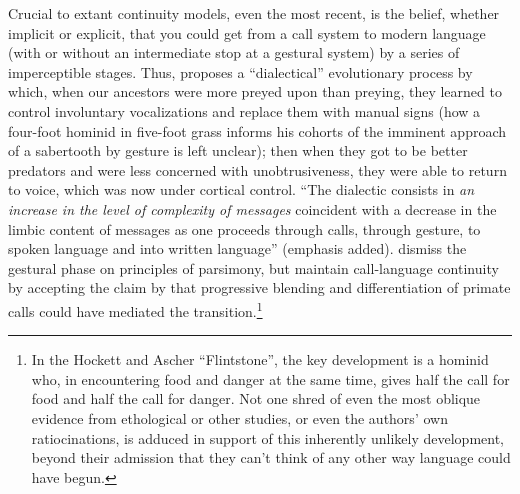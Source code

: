Crucial to extant continuity models, even the most recent, is
the belief, whether implicit or explicit, that you could get from a call system to modern language (with or without an intermediate stop at a gestural system) by a series of imperceptible stages. Thus, \citet{Stephenson1979} proposes a ``dialectical'' evolutionary process by which, when our ancestors were more preyed upon than preying, they learned to control involuntary vocalizations and replace them with manual signs (how a four-foot hominid in five-foot grass informs his cohorts of the imminent approach of a sabertooth by gesture is left unclear); then when they got to be better predators and were less concerned with unobtrusiveness, they were able to return to voice, which was now under cortical control. ``The dialectic consists in \textit{an increase in the level of complexity of messages} coincident with a decrease in the limbic content of messages as one proceeds through calls, through gesture, to spoken language and into written language'' (emphasis added). \citet{SteklisEtAl1979} dismiss the gestural phase on principles of parsimony, but maintain call-language continuity by accepting the claim by \citet{HockettEtAl1964} that progressive blending and differentiation of primate calls could have mediated the transition.\footnote{In the Hockett and Ascher  ``Flintstone'', the key development is a hominid who, in encountering food and danger at the same time, gives half the call for food and half the call for danger. Not one shred of even the most oblique evidence from ethological or other studies, or even the authors' own ratiocinations, is adduced in support of this inherently unlikely development, beyond their admission that they can't think of any other way language could have begun.}

